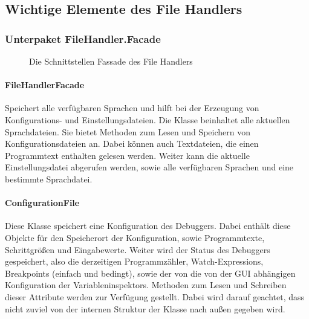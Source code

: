 \documentclass[parskip=full]{scrartcl}
\begin{document}
\subsection{Wichtige Elemente des File Handlers}
\subsubsection{Unterpaket FileHandler.Facade}
\begin{figure}[!h]
\caption{Die Schnittstellen Fassade des File Handlers}
\label{fig:facade_fileHandler}
\end{figure}
\paragraph{FileHandlerFacade}
Speichert alle verfügbaren Sprachen und hilft bei der Erzeugung von Konfigurations- und Einstellungsdateien.
Die Klasse beinhaltet alle aktuellen Sprachdateien.
Sie bietet Methoden zum Lesen und Speichern von Konfigurationsdateien an. Dabei können auch Textdateien, die einen Programmtext enthalten gelesen werden.
Weiter kann die aktuelle Einstellungsdatei abgerufen werden, sowie alle verfügbaren Sprachen und eine bestimmte Sprachdatei.
\paragraph{ConfigurationFile}
Diese Klasse speichert eine Konfiguration des Debuggers.
Dabei enthält diese Objekte für den Speicherort der Konfiguration, sowie Programmtexte, Schrittgrößen und Eingabewerte.
Weiter wird der Status des Debuggers gespeichert, also die derzeitigen Programmzähler, Watch-Expressions, Breakpoints (einfach und bedingt), sowie der von die von der GUI abhängigen Konfiguration der Variableninspektors.
Methoden zum Lesen und Schreiben dieser Attribute werden zur Verfügung gestellt. Dabei wird darauf geachtet, dass nicht zuviel von der internen Struktur der Klasse nach außen gegeben wird.
\end{document}
